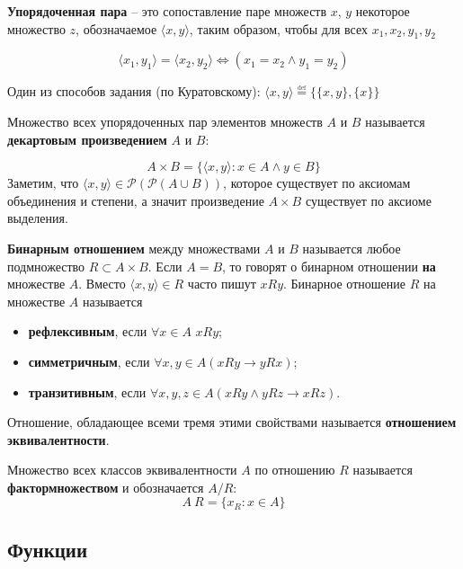 \begin{definition}
	\textbf{Упорядоченная пара} -- это сопоставление паре множеств $x$, $y$ некоторое множество $z$,
	обозначаемое $\langle x, y \rangle$, таким образом, чтобы для всех $x_1, x_2, y_1, y_2$

	$$ \langle x_1, y_1 \rangle = \langle x_2, y_2 \rangle \Longleftrightarrow (x_1 = x_2 \land y_1 = y_2) $$
\end{definition}
Один из способов задания (по Куратовскому):  $\langle x, y \rangle \overset{\underset{\mathrm{def}}{}}{=} \{\{x,
y\}, \{x\}\}$
\begin{definition}
	Множество всех упорядоченных пар элементов множеств $A$ и $B$ называется \textbf{декартовым
	произведением} $A$ и $B$:

	$$ A \times B = \{\langle x, y \rangle : x \in A \land y \in B\} $$
	Заметим, что $\langle x, y \rangle \in \mathcal{P} ( \mathcal{P} ( A \cup B))$, которое существует по аксиомам
	объединения и степени, а значит произведение $ A \times B$ существует по аксиоме выделения.
\end{definition}

\begin{definition}\textbf{Бинарным отношением} между множествами $A$ и $B$ называется любое подмножество $R \subset A
	\times B$. Если $A = B$, то говорят о бинарном отношении \textbf{на} множестве $A$. Вместо $\langle x, y \rangle
	\in R$ часто пишут $xRy$. Бинарное отношение $R$ на множестве $A$ называется
	\begin{itemize}
		\item \textbf{рефлексивным}, если $ \forall x \in A$ $xRy$;

		\item \textbf{симметричным}, если $\forall x,y \in A (xRy \rightarrow yRx)$;

		\item \textbf{транзитивным}, если $\forall x,y,z \in A (xRy \land yRz \rightarrow xRz)$.
	\end{itemize}
	Отношение, обладающее всеми тремя этими свойствами называется \textbf{отношением эквивалентности}.
\end{definition}

\begin{definition}Множество всех классов эквивалентности $A$ по отношению $R$ называется \textbf{фактормножеством} и
	обозначается $A / R$:
	$$ A \ R = \{ x_R : x \in A \} $$
\end{definition}

\subsection{Функции}

